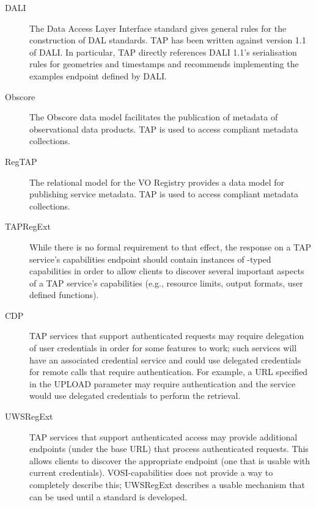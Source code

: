 \documentclass[11pt,letter]{ivoa}
\begin{document}
\begin{description}
\item[DALI \citep{2017ivoa.spec.0517D}]  The Data Access Layer Interface standard
gives general rules for the construction of DAL standards.  TAP has been
written against version 1.1 of DALI.  In particular, TAP directly
references DALI 1.1's serialisation rules for geometries and timestamps
and recommends implementing the examples endpoint defined by DALI.

\item[Obscore \citep{2011ivoa.spec.1028T}] The Obscore data model
facilitates the publication of metadata of observational data products.
TAP is used to access compliant metadata collections.

\item[RegTAP \citep{2014ivoa.spec.1208D}]  The relational model for the
VO Registry provides a data model for publishing service metadata.
TAP is used to access compliant metadata collections.

\item[TAPRegExt \citep{2012ivoa.spec.0827D}] While there is no formal
requirement to that effect, the response on a TAP service's capabilities
endpoint should contain instances of -typed
capabilities in order to allow clients to discover several important
aspects of a TAP service's capabilities (e.g., resource limits, output
formats, user defined functions).

\item[CDP \citep{2010ivoa.spec.0218P}] TAP services that support authenticated requests may require 
delegation of user credentials in order for some features to work; such services
will have an associated credential service and could use delegated credentials for 
remote calls that require authentication. For example, a URL specified in the UPLOAD
parameter may require authentication and the service would use delegated credentials
to perform the retrieval.

\item[UWSRegExt \citep{note:UWSRegExt}] TAP services that support authenticated access may provide additional endpoints (under the base URL) that process authenticated requests. This allows clients to discover the appropriate endpoint (one that is usable with current credentials). VOSI-capabilities 
does not provide a way to completely describe this; UWSRegExt describes a usable mechanism that 
can be used until a standard is developed.
\end{description}
\end{document}
